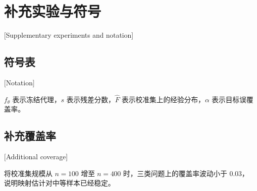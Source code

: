 \chapter{补充实验与符号}[Supplementary experiments and notation]

\section{符号表}[Notation]

$f_\theta$ 表示冻结代理，$s$ 表示残差分数，$\hat F$ 表示校准集上的经验分布，$\alpha$ 表示目标误覆盖率。

\section{补充覆盖率}[Additional coverage]

将校准集规模从 $n=100$ 增至 $n=400$ 时，三类问题上的覆盖率波动小于 $0.03$，说明映射估计对中等样本已经稳定。
